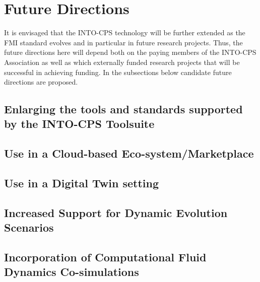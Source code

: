 %
%
%
\section{Future Directions}\label{sec:future}


It is envisaged that the INTO-CPS technology will be further extended as the FMI standard evolves and in particular in future research projects. Thus, the future directions here will depend both on the paying members of the INTO-CPS Association as well as which externally funded research projects that will be successful in achieving funding. In the subsections below candidate future directions are proposed.

\subsection{Enlarging the tools and standards supported by the INTO-CPS Toolsuite}

\subsection{Use in a Cloud-based Eco-system/Marketplace}

\subsection{Use in a Digital Twin setting}

\subsection{Increased Support for Dynamic Evolution Scenarios}

\subsection{Incorporation of Computational Fluid Dynamics Co-simulations}

